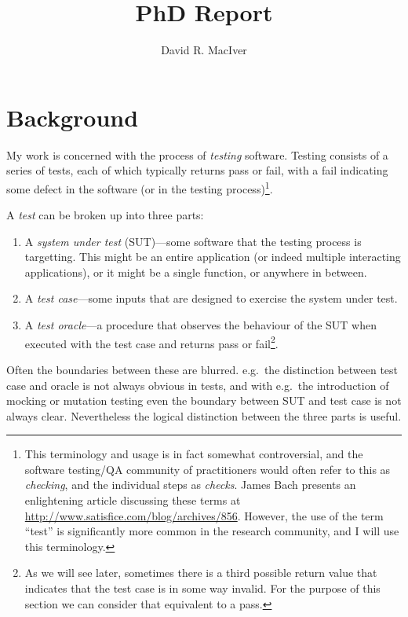 

\title{PhD Report}
\author{David R. MacIver}



\maketitle

\tableofcontents

\chapter{Background}\label{chap:introduction}

My work is concerned with the process of \emph{testing} software.
Testing consists of a series of tests,
each of which typically returns pass or fail,
with a fail indicating some defect in the software (or in the testing process)\footnote{
This terminology and usage is in fact somewhat controversial,
and the software testing/QA community of practitioners would often refer to this as \emph{checking},
and the individual steps as \emph{checks}.
James Bach presents an enlightening article discussing these terms at \url{http://www.satisfice.com/blog/archives/856}.
However,
the use of the term ``test'' is significantly more common in the research community,
and I will use this terminology.
}.

A \emph{test} can be broken up into three parts:

\begin{enumerate}
\item A \emph{system under test} (SUT)---some software that the testing process is targetting.
This might be an entire application (or indeed multiple interacting applications),
or it might be a single function,
or anywhere in between.
\item A \emph{test case}---some
inputs that are designed to exercise the system under test.
\item A \emph{test oracle}---a
procedure that observes the behaviour of the SUT when executed with the test case and returns pass or fail\footnote{
As we will see later, sometimes there is a third possible return value that indicates that the test case is in some way invalid.
For the purpose of this section we can consider that equivalent to a pass.
}.
\end{enumerate}

Often the boundaries between these are blurred.
e.g.\ the distinction between test case and oracle is not always obvious in tests,
and with e.g.\ the introduction of mocking or mutation testing even the boundary between SUT and test case is not always clear.
Nevertheless the logical distinction between the three parts is useful.

